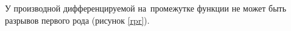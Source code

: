 
    У производной дифференцируемой на~промежутке функции не может быть разрывов первого рода (рисунок \ref{rpr}).
